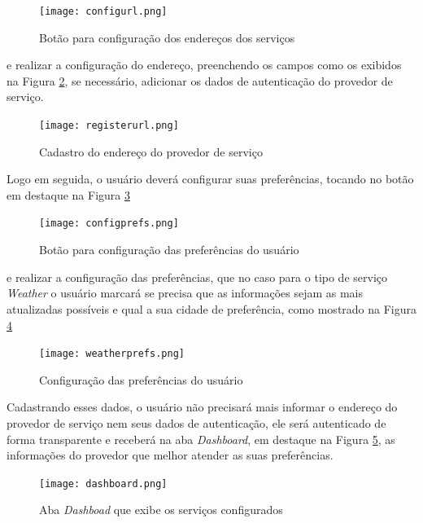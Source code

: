 \begin{figure}[!htb]
  \centering
  \texttt{[image: configurl.png]} %
  \caption[Botão para configuração dos endereços dos serviços]{Botão para configuração dos endereços dos serviços}
  \label{fig:configurl}
\end{figure}

e realizar a configuração do endereço, preenchendo os campos como os exibidos na Figura \ref{fig:registerurl}, se necessário, adicionar os dados de autenticação do provedor de serviço.

\begin{figure}[!htb]
  \centering
  \texttt{[image: registerurl.png]} %
  \caption[Cadastro do endereço do provedor de serviço]{Cadastro do endereço do provedor de serviço}
  \label{fig:registerurl}
\end{figure}

Logo em seguida, o usuário deverá configurar suas preferências, tocando no botão em destaque na Figura \ref{fig:configprefs}

\begin{figure}[!htb]
  \centering
  \texttt{[image: configprefs.png]} %
  \caption[Botão para configuração das preferências do usuário]{Botão para configuração das preferências do usuário}
  \label{fig:configprefs}
\end{figure}

e realizar a configuração das preferências, que no caso para o tipo de serviço \textit{Weather} o usuário marcará se precisa que as informações sejam as mais atualizadas possíveis e qual a sua cidade de preferência, como mostrado na Figura \ref{fig:weatherprefs}

\begin{figure}[!htb]
  \centering
  \texttt{[image: weatherprefs.png]} %
  \caption[Configuração das preferências do usuário]{Configuração das preferências do usuário}
  \label{fig:weatherprefs}
\end{figure}

Cadastrando esses dados, o usuário não precisará mais informar o endereço do provedor de serviço nem seus dados de autenticação, ele será autenticado de forma transparente e receberá na aba \textit{Dashboard}, em destaque na Figura \ref{fig:dashboard}, as informações do provedor que melhor atender as suas preferências.

\begin{figure}[!htb]
  \centering
  \texttt{[image: dashboard.png]} %
  \caption[Aba \textit{Dashboad} que exibe os serviços configurados]{Aba \textit{Dashboad} que exibe os serviços configurados}
  \label{fig:dashboard}
\end{figure}

